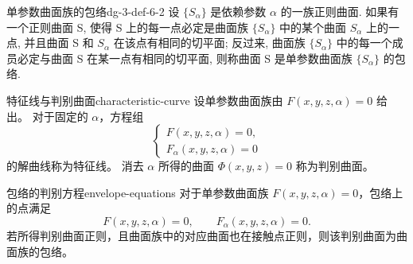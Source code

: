 \begin{definition}{单参数曲面族的包络}{dg-3-def-6-2}
设  \(\{S_{\alpha}\}\)  是依赖参数  \(\alpha\)  的一族正则曲面. 如果有一个正则曲面 S, 使得 S 上的每一点必定是曲面族  \(\{S_{\alpha}\}\)  中的某个曲面  \(S_{\alpha}\)  上的一点, 并且曲面 S 和  \(S_{\alpha}\)  在该点有相同的切平面; 反过来, 曲面族  \(\{S_{\alpha}\}\)  中的每一个成员必定与曲面 S 在某一点有相同的切平面, 则称曲面 S 是单参数曲面族  \(\{S_{\alpha}\}\)  的包络.
\end{definition}

\begin{definition}{特征线与判别曲面}{characteristic-curve}
设单参数曲面族由 $F(x,y,z,\alpha)=0$ 给出。
对于固定的 $\alpha$，方程组
\[
\begin{cases}
F(x,y,z,\alpha)=0,\\
F_\alpha(x,y,z,\alpha)=0
\end{cases}
\]
的解曲线称为特征线。
消去 $\alpha$ 所得的曲面 $\Phi(x,y,z)=0$ 称为判别曲面。
\end{definition}

\begin{proposition}{包络的判别方程}{envelope-equations}
对于单参数曲面族 $F(x,y,z,\alpha)=0$，包络上的点满足
\[
F(x,y,z,\alpha)=0,\qquad F_\alpha(x,y,z,\alpha)=0.
\]
若所得判别曲面正则，且曲面族中的对应曲面也在接触点正则，则该判别曲面为曲面族的包络。
\end{proposition}
